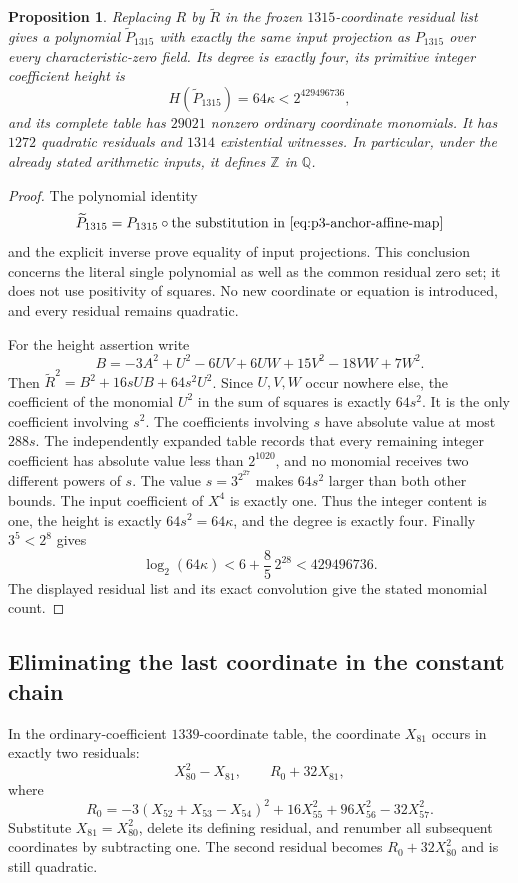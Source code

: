 \documentclass[11pt]{article}
\newtheorem{proposition}[theorem]{Proposition}
\theoremstyle{definition}
\begin{document}
\begin{proposition}\label{prop:p3-translated-quartic}
Replacing $R$ by $\widetilde R$ in the frozen $1315$-coordinate
residual list gives a polynomial $\widetilde P_{1315}$ with exactly
the same input projection as $P_{1315}$ over every characteristic-zero
field.  Its degree is exactly four, its primitive integer coefficient
height is
\[
                  H(\widetilde P_{1315})=64\kappa
                                      <2^{429496736},
\]
and its complete table has $29021$ nonzero ordinary coordinate
monomials.  It has $1272$ quadratic residuals and $1314$ existential
witnesses.  In particular, under the already stated arithmetic inputs,
it defines $\mathbb Z$ in $\mathbb Q$.
\end{proposition}
\begin{proof}
The polynomial identity
\[
 \widetilde P_{1315}
       =P_{1315}\circ\text{the substitution in
                           \eqref{eq:p3-anchor-affine-map}}
\]
and the explicit inverse prove equality of input projections.
This conclusion concerns the literal single polynomial as well as
the common residual zero set; it does not use positivity of squares.
No new coordinate or equation is introduced, and every residual
remains quadratic.

For the height assertion write
\[
 B=-3A^2+U^2-6UV+6UW+15V^2-18VW+7W^2.
\]
Then $\widetilde R^2=B^2+16sUB+64s^2U^2$.  Since $U,V,W$
occur nowhere else, the coefficient of the monomial $U^2$ in
the sum of squares is exactly $64s^2$.  It is the only coefficient
involving $s^2$.  The coefficients involving $s$ have absolute value
at most $288s$.  The independently expanded table records that
every remaining integer coefficient has absolute value less than
$2^{1020}$, and no monomial receives two different powers of $s$.
The value $s=3^{2^{27}}$ makes $64s^2$ larger than both other bounds.
The input coefficient of $X^4$ is exactly one.  Thus the integer
content is one, the height is exactly $64s^2=64\kappa$, and the
degree is exactly four.  Finally $3^5<2^8$ gives
\[
 \log_2(64\kappa)<6+\frac85\,2^{28}<429496736.
\]
The displayed residual list and its exact convolution give the
stated monomial count.
\end{proof}

\subsection{Eliminating the last coordinate in the constant chain}

In the ordinary-coefficient $1339$-coordinate table, the coordinate
$X_{81}$ occurs in exactly two residuals:
\[
                   X_{80}^2-X_{81},\qquad R_0+32X_{81},
\]
where
\[
 R_0=-3(X_{52}+X_{53}-X_{54})^2
                       +16X_{55}^2+96X_{56}^2-32X_{57}^2.
\]
Substitute $X_{81}=X_{80}^2$, delete its defining residual, and
renumber all subsequent coordinates by subtracting one.  The second
residual becomes $R_0+32X_{80}^2$ and is still quadratic.
\end{document}
